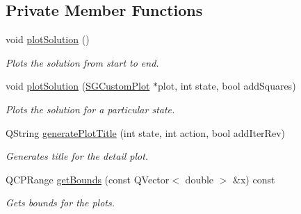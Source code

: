 \subsection*{Private Member Functions}
\begin{DoxyCompactItemize}
\item 
\mbox{\label{classSGSolutionHandler_a1096133ea0ff25fb447a0d56cdb29688}} 
void \hyperlink{classSGSolutionHandler_a1096133ea0ff25fb447a0d56cdb29688}{plot\+Solution} ()
\begin{DoxyCompactList}\small\item\em Plots the solution from start to end. \end{DoxyCompactList}\item 
\mbox{\label{classSGSolutionHandler_ae33873ed4d757ba34f7031526790a2e1}} 
void \hyperlink{classSGSolutionHandler_ae33873ed4d757ba34f7031526790a2e1}{plot\+Solution} (\hyperlink{classSGCustomPlot}{S\+G\+Custom\+Plot} $\ast$plot, int state, bool add\+Squares)
\begin{DoxyCompactList}\small\item\em Plots the solution for a particular state. \end{DoxyCompactList}\item 
\mbox{\label{classSGSolutionHandler_a48f0430bc242ab6caa5e5b915c0085df}} 
Q\+String \hyperlink{classSGSolutionHandler_a48f0430bc242ab6caa5e5b915c0085df}{generate\+Plot\+Title} (int state, int action, bool add\+Iter\+Rev)
\begin{DoxyCompactList}\small\item\em Generates title for the detail plot. \end{DoxyCompactList}\item 
\mbox{\label{classSGSolutionHandler_aec8de85edd3f104f5a1e2b896a58d0b0}} 
Q\+C\+P\+Range \hyperlink{classSGSolutionHandler_aec8de85edd3f104f5a1e2b896a58d0b0}{get\+Bounds} (const Q\+Vector$<$ double $>$ \&x) const
\begin{DoxyCompactList}\small\item\em Gets bounds for the plots. \end{DoxyCompactList}\item 
\mbox{\label{classSGSolutionHandler_a86d0a38bc3afbe289ddb0844d02f69bb}} 

\end{DoxyCompactItemize}

